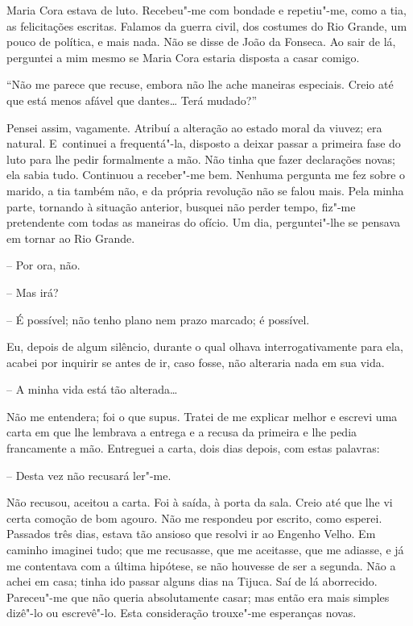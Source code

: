 Maria Cora estava de luto. Recebeu"-me com bondade e repetiu"-me, como a
tia, as felicitações escritas. Falamos da guerra civil, dos costumes do
Rio Grande, um pouco de política, e mais nada. Não se disse de João da
Fonseca. Ao sair de lá, perguntei a mim mesmo se Maria Cora estaria
disposta a casar comigo.

``Não me parece que recuse, embora não lhe ache maneiras especiais.
Creio até que está menos afável que dantes\ldots{} Terá mudado?''

Pensei assim, vagamente. Atribuí a alteração ao estado moral da viuvez;
era natural. E~continuei a frequentá"-la, disposto a deixar passar a
primeira fase do luto para lhe pedir formalmente a mão. Não tinha que
fazer declarações novas; ela sabia tudo. Continuou a receber"-me bem.
Nenhuma pergunta me fez sobre o marido, a tia também não, e da própria
revolução não se falou mais. Pela minha parte, tornando à situação
anterior, busquei não perder tempo, fiz"-me pretendente com todas as
maneiras do ofício. Um dia, perguntei"-lhe se pensava em tornar ao Rio
Grande.

-- Por ora, não.

-- Mas irá?

-- É possível; não tenho plano nem prazo marcado; é possível.

Eu, depois de algum silêncio, durante o qual olhava interrogativamente
para ela, acabei por inquirir se antes de ir, caso fosse, não alteraria
nada em sua vida.

-- A minha vida está tão alterada\ldots{}

Não me entendera; foi o que supus. Tratei de me explicar melhor e
escrevi uma carta em que lhe lembrava a entrega e a recusa da primeira e
lhe pedia francamente a mão. Entreguei a carta, dois dias depois, com
estas palavras:

-- Desta vez não recusará ler"-me.

Não recusou, aceitou a carta. Foi à saída, à porta da sala. Creio até
que lhe vi certa comoção de bom agouro. Não me respondeu por escrito,
como esperei. Passados três dias, estava tão ansioso que resolvi ir ao
Engenho Velho. Em caminho imaginei tudo; que me recusasse, que me
aceitasse, que me adiasse, e já me contentava com a última hipótese, se
não houvesse de ser a segunda. Não a achei em casa; tinha ido passar
alguns dias na Tijuca. Saí de lá aborrecido. Pareceu"-me que não queria
absolutamente casar; mas então era mais simples dizê"-lo ou escrevê"-lo.
Esta consideração trouxe"-me esperanças novas.

